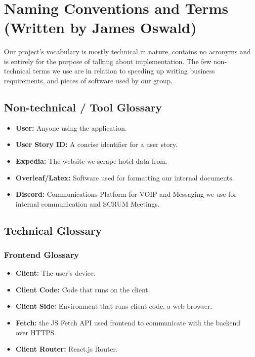 \documentclass[]{article}
\begin{document}
\section{Naming Conventions and Terms\\ (Written by James Oswald)}
\paragraph{}
Our project's vocabulary is mostly technical in nature, contains no acronyms and is entirely for the purpose of talking about implementation. The few non-technical terms we use are in relation to speeding up writing business requirements, and pieces of software used by our group.
\subsection{Non-technical / Tool Glossary}
\begin{itemize}
    \item \textbf{User:} Anyone using the application.
    \item \textbf{User Story ID:} A concise identifier for a user story.
    \item \textbf{Expedia:} The website we scrape hotel data from.
    \item \textbf{Overleaf/Latex:} Software used for formatting our internal documents. 
    \item \textbf{Discord:} Communications Platform for VOIP and Messaging we use for internal communication and SCRUM Meetings.
    
\end{itemize}
\subsection{Technical Glossary}
\subsubsection{Frontend Glossary}
\begin{itemize}
    \item \textbf{Client:} The user's device. 
    \item \textbf{Client Code:} Code that runs on the client. 
    \item \textbf{Client Side:} Environment that runs client code, a web browser. 
    \item \textbf{Fetch:} the JS Fetch API used frontend to communicate with the backend over HTTPS.
    \item \textbf{Client Router:} React.js Router. 
\end{itemize}
\end{document}
